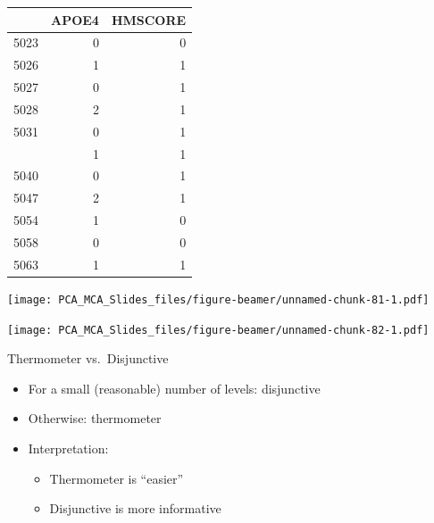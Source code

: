 \documentclass[
  ignorenonframetext,
]{beamer}
\providecommand{\tightlist}{%
  \setlength{\itemsep}{0pt}\setlength{\parskip}{0pt}}
\begin{document}
\begin{frame}

\begin{table}[H]
\centering\begingroup\fontsize{7}{9}\selectfont

\begin{tabular}{lrr}
\toprule
  & APOE4 & HMSCORE\\
\midrule
5023 & 0 & 0\\
5026 & 1 & 1\\
5027 & 0 & 1\\
5028 & 2 & 1\\
5031 & 0 & 1\\
\addlinespace
5037 & 1 & 1\\
5040 & 0 & 1\\
5047 & 2 & 1\\
5054 & 1 & 0\\
5058 & 0 & 0\\
5063 & 1 & 1\\
\bottomrule
\end{tabular}\endgroup{}
\end{table}

\end{frame}

\begin{frame}

\texttt{[image: PCA\_MCA\_Slides\_files/figure-beamer/unnamed-chunk-81-1.pdf]}

\end{frame}

\begin{frame}

\texttt{[image: PCA\_MCA\_Slides\_files/figure-beamer/unnamed-chunk-82-1.pdf]}

\end{frame}

\begin{frame}{Thermometer vs.~Disjunctive}
\protect\hypertarget{thermometer-vs.-disjunctive-1}{}

\begin{itemize}[<+->]
\tightlist
\item
  For a small (reasonable) number of levels: disjunctive
\item
  Otherwise: thermometer
\item
  Interpretation:

  \begin{itemize}[<+->]
  \tightlist
  \item
    Thermometer is ``easier''
  \item
    Disjunctive is more informative
  \end{itemize}
\end{itemize}

\end{frame}
\end{document}
